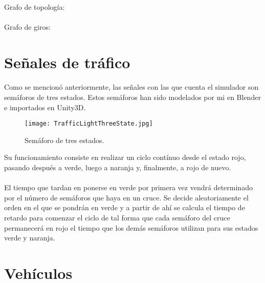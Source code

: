 	\paragraph{}
	Grafo de topología:
	\tiny
	
	\normalsize
	\paragraph{}	
	Grafo de giros:
	\tiny
	
	\normalsize
	
\section{Señales de tráfico}
\label{section:trafficSignals}
	\paragraph{}
	Como se mencionó anteriormente, las señales con las que cuenta el simulador son semáforos de tres estados. Estos semáforos han sido modelados por mi en Blender \cite{Blender_web} e importados en Unity3D.
	
	\begin{figure}[H]
		\centering
			\texttt{[image: TrafficLightThreeState.jpg]}
	\caption{Semáforo de tres estados.}
	\label{fig:ThreeStateTrafficLight}
	\end{figure}
	
	Su funcionamiento consiste en realizar un ciclo contínuo desde el estado rojo, pasando después a verde, luego a naranja y, finalmente, a rojo de nuevo.
	
	\paragraph{}	
	El tiempo que tardan en ponerse en verde por primera vez vendrá determinado por el número de semáforos que haya en un cruce. Se decide aleatoriamente el orden en el que se pondrán en verde y a partir de ahí se calcula el tiempo de retardo para comenzar el ciclo de tal forma que cada semáforo del cruce permanecerá en rojo el tiempo que los demás semáforos utilizan para sus estados verde y naranja.

\section{Vehículos}
	
